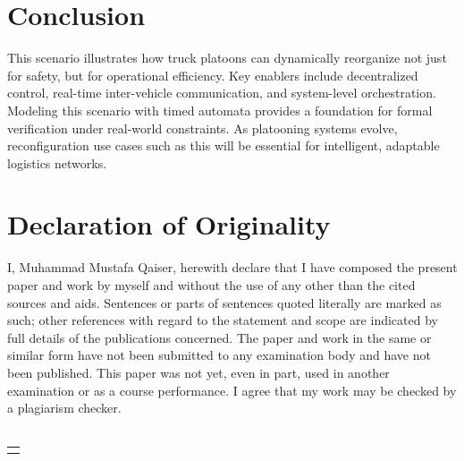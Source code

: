 \documentclass[english]{lni}
\begin{document}
\section{Conclusion}

This scenario illustrates how truck platoons can dynamically reorganize not just for safety, but for operational efficiency. Key enablers include decentralized control, real-time inter-vehicle communication, and system-level orchestration. Modeling this scenario with timed automata provides a foundation for formal verification under real-world constraints. As platooning systems evolve, reconfiguration use cases such as this will be essential for intelligent, adaptable logistics networks.










\section{Declaration of Originality}

I, Muhammad Mustafa Qaiser, herewith declare that I have composed the present paper and work by myself and without the use of any other than the cited sources and aids. Sentences or parts of sentences quoted literally are marked as such; other references with regard to the statement and scope are indicated by full details of the publications concerned. The paper and work in the same or similar form have not been submitted to any examination body and have not been published. This paper was not yet, even in part, used in another examination or as a course performance. I agree that my work may be checked by a plagiarism checker. \\~\\




\hspace*{\fill}\begin{tabular}{@{}l@{}}\hline
	\makebox[10cm]{30/05/2025, Lippstadt - Muhammad Mustafa Qaiser}
\end{tabular}

\end{document}
